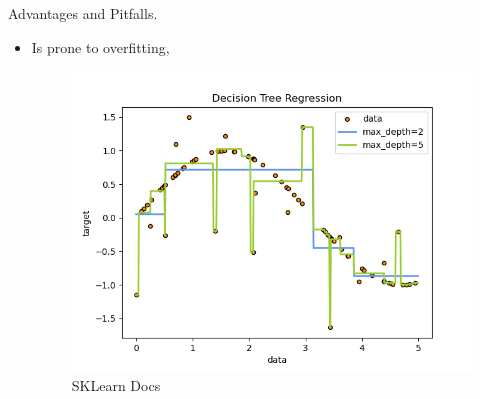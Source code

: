 \documentclass[xcolor={svgnames},
               hyperref={colorlinks,citecolor=DeepPink4,linkcolor=FireBrick,urlcolor=Maroon}]
               {beamer}
\begin{document}
  
  \begin{frame}{Advantages and Pitfalls.}
    \begin{itemize}
      \item Is prone to overfitting, 
      \begin{figure}
        \vspace*{\fill}
        \begin{center}
      \includegraphics[width=.70\textwidth]{Overfitting.png}
        \end{center}
        \caption{SKLearn Docs}
        \vspace*{\fill}
      \end{figure}
    \end{itemize}
  \end{frame}
\end{document}
